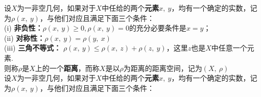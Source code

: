 
\begin{newdef}
    设$X$为一非空几何，如果对于$X$中任给的两个\textbf{元素}$x,\ y$，均有一个确定的实数，记为$\rho\left( x, \ y \right)$，与他们对应且满足下面三个条件：\\
    (i) \textbf{非负性：}$\rho (x,\ y)\geqslant 0, \rho (x,\ y)=0 $的充分必要条件是$x=y$；\\
    (ii) \textbf{对称性：}$\rho (x,\ y)=\rho (y, \ x)$\\
    (iii) \textbf{三角不等式：} $\rho (x,\ y)\leqslant \rho (x,\ z)+\rho (z, \ y)$，这里$z$也是$X$中任意一个元素.\\
则称$\rho $是$X$上的一个\textbf{距离}，而称$X$是以$\rho$为距离的距离空间，记为$(X, \ \rho)$\\
设$X$为一非空几何，如果对于$X$中任给的两个\textbf{元素}$x,\ y$，均有一个确定的实数，记为$\rho\left( x, \ y \right)$，与他们对应且满足下面三个条件：

\end{newdef}
























